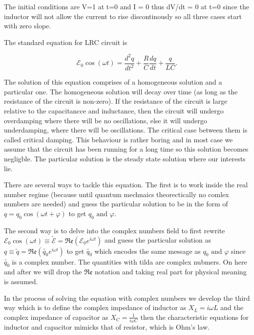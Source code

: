 \documentclass[english,a4paper,12pt]{report}
\begin{document}
The initial conditions are V=1 at t=0 and I = 0 thus dV/dt = 0 at t=0 since the inductor will not allow the current to rise discontinously so all three cases start with zero slope.

The standard equation for LRC circuit is 

\begin{equation}
    \mathcal{E}_{0}\cos (\omega t)  =  \frac{d^2q}{dt^2} + \frac{R}{C}\frac{dq}{dt} + \frac{q}{LC}.   
\end{equation}

The solution of this equation comprises of a homogeneous solution and a particular one. The homogeneous solution will decay over time (as long as the resistance of the circuit is non-zero). If the resistance of the circuit is large relative to the capacitancce and inductance, then the circuit will undergo overdamping where there will be no oscillations, else it will undergo underdamping, where there will be oscillations. The critical case between them is called critical damping. This behaviour is rather boring and in most case we assume that the circuit has been running for a long time so this solution becomes negligble. The particular solution is the steady state solution where our interests lie.

There are several ways to tackle this equation. The first is to work inside the real number regime (because until quantum mechnaics theorectically no comlex numbers are needed) and guess the particular solution to be in the form of \(q = q_0 \cos (\omega t + \varphi )\) to get \(q_0 \text { and } \varphi \).

The second way is to delve into the complex numbers field to first rewrite \(\mathcal{E}_{0} \cos (\omega t) \equiv \tilde{\mathcal{E}} = \mathfrak{Re} (\mathcal{E}_{0} e^{i \omega t}  ) \) and guess the particular solution as \(q \equiv \tilde{q} = \mathfrak{Re} ( \tilde{q_0 }e^{i \omega t})  \) to get \(\tilde{q_0 } \) which encodes the same message as \(q_0 \text { and } \varphi \) since \(\tilde{q_0 } \) is a complex number. The quantities with tilda are complex nubmers. On here and after we will drop the \(\mathfrak{Re}  \) notation and taking real part for physical meaning is assumed. 

In the process of solving the equation with complex numbers we develop the third way which is to define the complex impedance of inductor as \(X_{L} = i \omega L \) and the complex impedance of capacitor as \(X_{C} = \frac{1}{i \omega C}  \) then the characteristic equations for inductor and capacitor mimicks that of resistor, which is Ohm's law.
\end{document}
